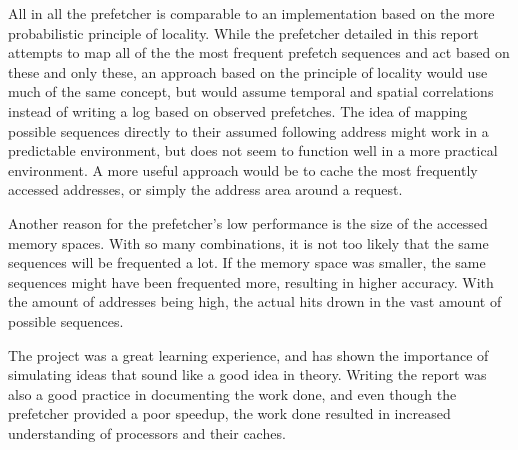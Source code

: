 All in all the prefetcher is comparable to an implementation based on the more probabilistic principle of locality. While the prefetcher detailed in this report attempts to map all of the the most frequent prefetch sequences and act based on these and only these, an approach based on the principle of locality would use much of the same concept, but would assume temporal and spatial correlations instead of writing a log based on observed prefetches. The idea of mapping possible sequences directly to their assumed following address might work in a predictable environment, but does not seem to function well in a more practical environment. A more useful approach would be to cache the most frequently accessed addresses, or simply the address area around a request. 

Another reason for the prefetcher's low performance is the size of the accessed memory spaces. With so many combinations, it is not too likely that the same sequences will be frequented a lot. If the memory space was smaller, the same sequences might have been frequented more, resulting in higher accuracy. With the amount of addresses being high, the actual hits drown in the vast amount of possible sequences.

The project was a great learning experience, and has shown the importance of simulating ideas that sound like a good idea in theory. Writing the report was also a good practice in documenting the work done, and even though the prefetcher provided a poor speedup, the work done resulted in increased understanding of processors and their caches.